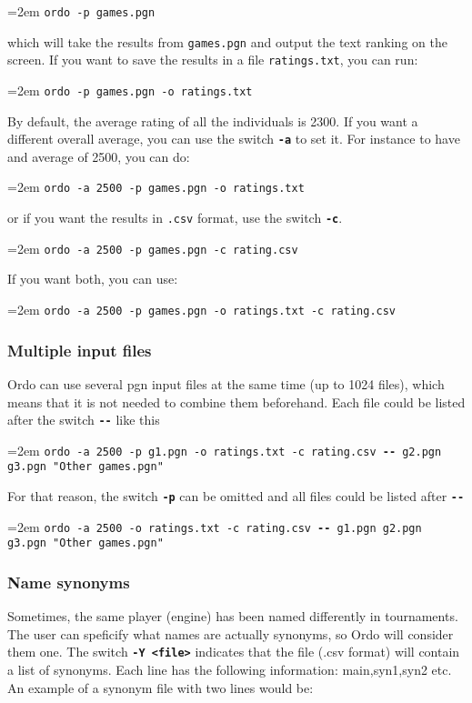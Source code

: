 \documentclass[12pt]{article}
\newcommand{\swtch} [1] {\texttt{\textbf{#1}}}
\newcommand{\filename} [1] {\texttt{#1}}
\newcommand{\cmdln}[1]{
	\par
	\begingroup
		\leftskip=2em
		\addtolength{\rightskip}{0em}
		\noindent \small{\texttt{#1}}
		\par
	\endgroup
}
\begin{document}
	\cmdln{ordo -p games.pgn}

which will take the results from \filename{games.pgn} and output the text ranking on the screen. 
If you want to save the results in a file \filename{ratings.txt}, you can run:

	\cmdln{ordo -p games.pgn -o ratings.txt}

By default, the average rating of all the individuals is 2300. 
If you want a different overall average, you can use the switch \swtch{-a} to set it. 
For instance to have and average of 2500, you can do:
	
	\cmdln{ordo -a 2500 -p games.pgn -o ratings.txt}

or if you want the results in \filename{.csv} format, use the switch \swtch{-c}.

	\cmdln{ordo -a 2500 -p games.pgn -c rating.csv}

If you want both, you can use:

	\cmdln{ordo -a 2500 -p games.pgn -o ratings.txt -c rating.csv}

\subsubsection*{Multiple input files}
Ordo can use several pgn input files at the same time (up to 1024 files), which means that it is not needed to combine them beforehand.
Each file could be listed after the switch \swtch{-}\swtch{-} like this

	\cmdln{ordo -a 2500 -p g1.pgn -o ratings.txt -c rating.csv \swtch{-}\swtch{-} g2.pgn g3.pgn "Other games.pgn"}

For that reason, the switch \swtch{-p} can be omitted and all files could be listed after \swtch{-}\swtch{-}

	\cmdln{ordo -a 2500 -o ratings.txt -c rating.csv \swtch{-}\swtch{-} g1.pgn g2.pgn g3.pgn "Other games.pgn"}

\subsubsection*{Name synonyms}
Sometimes, the same player (engine) has been named differently in tournaments.
The user can speficify what names are actually synonyms, so Ordo will consider them one.
The switch \swtch{-Y <file>} indicates that the file (.csv format) will contain a list of synonyms. 
Each line has the following information: main,syn1,syn2 etc.
An example of a synonym file with two lines would be:
\end{document}
